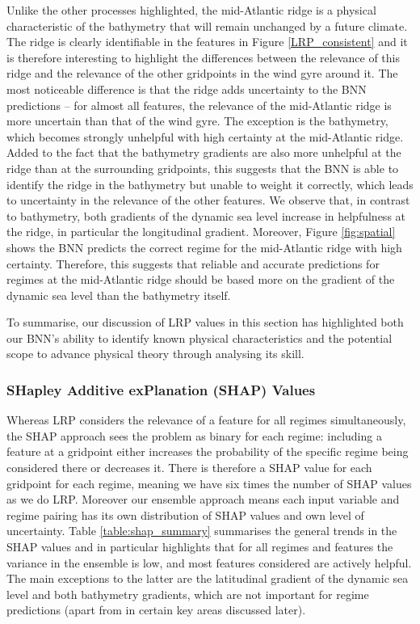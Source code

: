 \documentclass[a4paper]{article}
\begin{document}
Unlike the other processes highlighted, the mid-Atlantic ridge is a physical characteristic of the bathymetry that will remain unchanged by a future climate. The ridge is clearly identifiable in the features in Figure \ref{LRP_consistent} and it is therefore interesting to highlight the differences between the relevance of this ridge and the relevance of the other gridpoints in the wind gyre around it. The most noticeable difference is that the ridge adds uncertainty to the BNN predictions -- for almost all features, the relevance of the mid-Atlantic ridge is more uncertain than that of the wind gyre. The exception is the bathymetry, which becomes strongly unhelpful with high certainty at the mid-Atlantic ridge. Added to the fact that the bathymetry gradients are also more unhelpful at the ridge than at the surrounding gridpoints, this suggests that the BNN is able to identify the ridge in the bathymetry but unable to weight it correctly, which leads to uncertainty in the relevance of the other features. We observe that, in contrast to bathymetry, both gradients of the dynamic sea level increase in helpfulness at the ridge, in particular the longitudinal gradient. Moreover, Figure \ref{fig:spatial} shows the BNN predicts the correct regime for the mid-Atlantic ridge with high certainty. Therefore, this suggests that reliable and accurate predictions for regimes at the mid-Atlantic ridge should be based more on the gradient of the dynamic sea level than the bathymetry itself.

To summarise, our discussion of LRP values in this section has highlighted both our BNN's ability to identify known physical characteristics and the potential scope to advance physical theory through analysing its skill.

\subsubsection{SHapley Additive exPlanation (SHAP) Values}\label{sec:shap_results}
Whereas LRP considers the relevance of a feature for all regimes simultaneously, the SHAP approach sees the problem as binary for each regime: including a feature at a gridpoint either increases the probability of the specific regime being considered there or decreases it. There is therefore a SHAP value for each gridpoint for each regime, meaning we have six times the number of SHAP values as we do LRP. Moreover our ensemble approach means each input variable and regime pairing has its own distribution of SHAP values and own level of uncertainty. Table \ref{table:shap_summary} summarises the general trends in the SHAP values and in particular highlights that for all regimes and features the variance in the ensemble is low, and most features considered are actively helpful. The main exceptions to the latter are the latitudinal gradient of the dynamic sea level and both bathymetry gradients, which are not important for regime predictions (apart from in certain key areas discussed later). 
\end{document}
